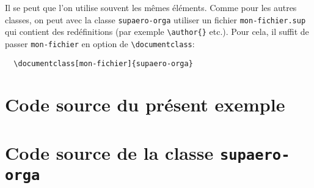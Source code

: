 \documentclass[fr]{supaero-orga}
\begin{document}
Il se peut que l'on utilise souvent les mêmes éléments. Comme pour les
autres classes, on peut avec la classe \texttt{supaero-orga} utiliser
un fichier \texttt{mon-fichier.sup} qui contient des redéfinitions
(par exemple \verb!\author{}! etc.). Pour cela, il suffit de passer
\verb!mon-fichier! en option de \verb!\documentclass!:

\begin{verbatim}
  \documentclass[mon-fichier]{supaero-orga}
\end{verbatim}

\section{Code source du présent exemple}



\section{Code source de la classe \texttt{supaero-orga}}
\label{sec:code-source}


\end{document}
